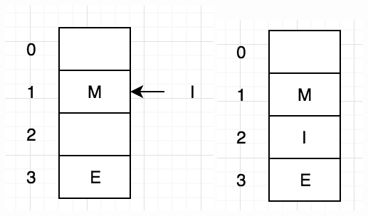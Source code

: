 \documentclass[a5paper,10pt,oneside]{article}
\begin{document}
 \includegraphics[scale=1]{Qua2}
 \includegraphics[scale=1]{Qua1}
 
\end{document}
